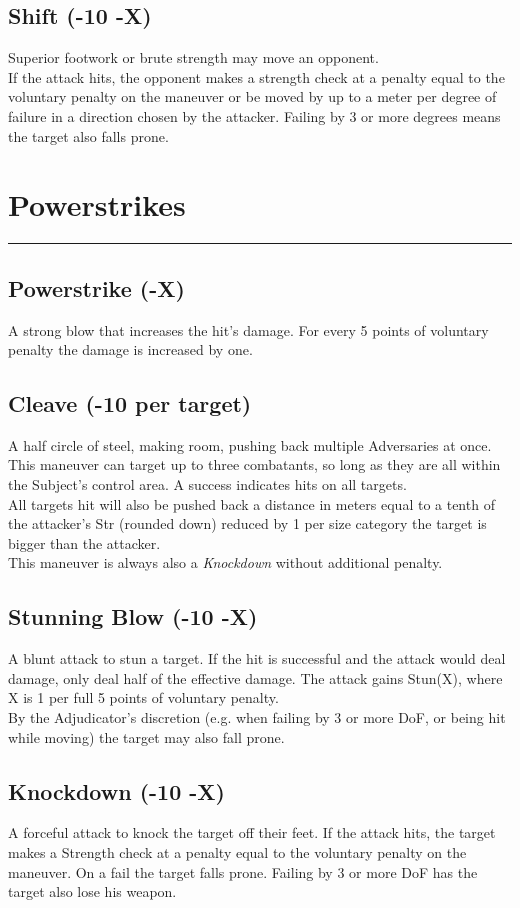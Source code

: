 \subsection*{Shift (-10 -X)}
Superior footwork or brute strength may move an opponent.
\\%
If the attack hits,
	the opponent makes a strength check at a penalty equal to the voluntary penalty on the maneuver
	or be moved by up to a meter per degree of failure in a direction chosen by the attacker.
Failing by 3 or more degrees means the target also falls prone.

\section*{Powerstrikes}
\hrule
\subsection*{Powerstrike (-X)}
\label{mvr:powerstrike}
A strong blow that increases the hit’s damage. For every 5 points of voluntary penalty the damage is increased by one.
\subsection*{Cleave (-10 per target)}
A half circle of steel, making room, pushing back multiple Adversaries at once.
This maneuver can target up to three combatants,
	so long as they are all within the Subject’s control area.
A success indicates hits on all targets.\\
All targets hit will also be pushed back a distance in meters equal to
	a tenth of the attacker’s Str (rounded down)
	reduced by 1 per size category the target is bigger than the attacker.\\
This maneuver is always also a \emph{Knockdown} without additional penalty.
\subsection*{Stunning Blow (-10 -X)}
A blunt attack to stun a target.
If the hit is successful and the attack would deal damage,
	only deal half of the effective damage.
The attack gains Stun(X), where X is 1 per full 5 points of voluntary penalty.
\\%
By the Adjudicator's discretion
	(e.g. when failing by 3 or more DoF,
	or being hit while moving)
	the target may also fall prone.
\subsection*{Knockdown (-10 -X)}
A forceful attack to knock the target off their feet. If the attack hits, the target makes a Strength check at a penalty equal to the voluntary penalty on the maneuver. On a fail the target falls prone. Failing by 3 or more DoF has the target also lose his weapon.
